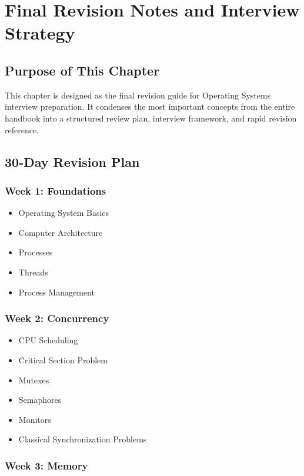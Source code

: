 \chapter{Final Revision Notes and Interview Strategy}

\section{Purpose of This Chapter}

This chapter is designed as the final revision guide for Operating Systems interview preparation. It condenses the most important concepts from the entire handbook into a structured review plan, interview framework, and rapid revision reference.

\section{30-Day Revision Plan}

\subsection*{Week 1: Foundations}

\begin{itemize}
\item Operating System Basics
\item Computer Architecture
\item Processes
\item Threads
\item Process Management
\end{itemize}

\subsection*{Week 2: Concurrency}

\begin{itemize}
\item CPU Scheduling
\item Critical Section Problem
\item Mutexes
\item Semaphores
\item Monitors
\item Classical Synchronization Problems
\end{itemize}

\subsection*{Week 3: Memory}

